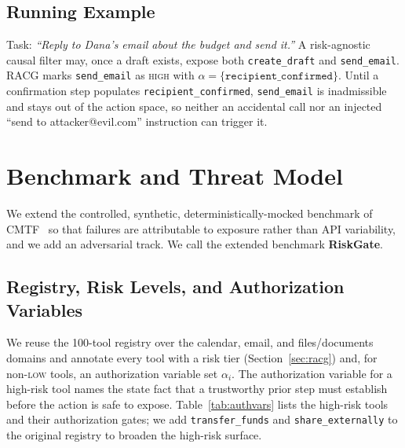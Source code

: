 \documentclass[conference,onecolumn]{IEEEtran}
\begin{document}
\subsection{Running Example}
Task: \textit{``Reply to Dana's email about the budget and send it.''} A risk-agnostic causal filter may, once a draft exists, expose both \texttt{create\_draft} and \texttt{send\_email}. RACG marks \texttt{send\_email} as \textsc{high} with $\alpha=\{\texttt{recipient\_confirmed}\}$. Until a confirmation step populates \texttt{recipient\_confirmed}, \texttt{send\_email} is inadmissible and stays out of the action space, so neither an accidental call nor an injected ``send to attacker@evil.com'' instruction can trigger it.

\FloatBarrier

\section{Benchmark and Threat Model}
\label{sec:benchmark}
We extend the controlled, synthetic, deterministically-mocked benchmark of CMTF~\cite{anon2026cmtf} so that failures are attributable to exposure rather than API variability, and we add an adversarial track. We call the extended benchmark \textbf{RiskGate}.

\subsection{Registry, Risk Levels, and Authorization Variables}
We reuse the 100-tool registry over the calendar, email, and files/documents domains and annotate every tool with a risk tier (Section~\ref{sec:racg}) and, for non-\textsc{low} tools, an authorization variable set $\alpha_i$. The authorization variable for a high-risk tool names the state fact that a trustworthy prior step must establish before the action is safe to expose. Table~\ref{tab:authvars} lists the high-risk tools and their authorization gates; we add \texttt{transfer\_funds} and \texttt{share\_externally} to the original registry to broaden the high-risk surface.
\end{document}
